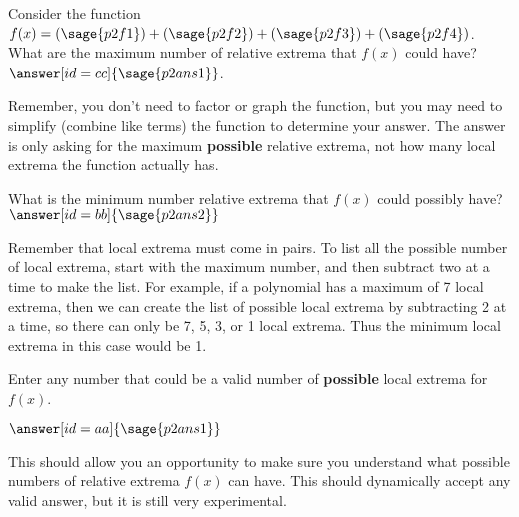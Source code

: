 \documentclass{ximera}
\begin{document}
\begin{problem}
    Consider the function $f(x) = (\sage{p2f1}) + (\sage{p2f2}) + (\sage{p2f3}) + (\sage{p2f4})$. What are the maximum number of relative extrema that $f(x)$ could have? $\answer[id=cc]{\sage{p2ans1}}$.
    \begin{feedback}
        Remember, you don't need to factor or graph the function, but you may need to simplify (combine like terms) the function to determine your answer. The answer is only asking for the maximum \textbf{possible} relative extrema, not how many local extrema the function actually has.
    \end{feedback}
    \begin{problem}
        What is the minimum number relative extrema that $f(x)$ could possibly have? $\answer[id=bb]{\sage{p2ans2}}$
        \begin{feedback}
            Remember that local extrema must come in pairs. To list all the possible number of local extrema, start with the maximum number, and then subtract two at a time to make the list. For example, if a polynomial has a maximum of 7 local extrema, then we can create the list of possible local extrema by subtracting 2 at a time, so there can only be 7, 5, 3, or 1 local extrema. Thus the minimum local extrema in this case would be 1. 
        \end{feedback}
        \begin{problem}
            Enter any number that could be a valid number of \textbf{possible} local extrema for $f(x)$.
            \begin{validator}[boundedSameParity(aa,bb,cc)]
                $\answer[id=aa]{\sage{p2ans1}}$
                \begin{feedback}
                    This should allow you an opportunity to make sure you understand what possible numbers of relative extrema $f(x)$ can have. This should dynamically accept any valid answer, but it is still very experimental.
                \end{feedback}
            \end{validator}
        \end{problem}
    \end{problem}
\end{problem}
\end{document}
